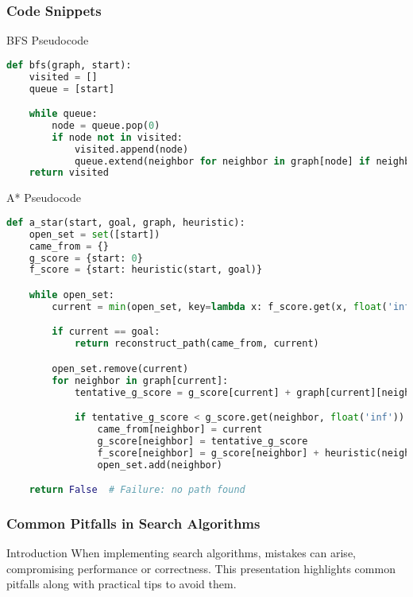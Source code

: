 \documentclass[aspectratio=169]{beamer}
\begin{document}
\begin{frame}[fragile]
    \frametitle{Code Snippets}
    \begin{block}{BFS Pseudocode}
    \begin{lstlisting}[language=Python]
def bfs(graph, start):
    visited = []
    queue = [start]

    while queue:
        node = queue.pop(0)
        if node not in visited:
            visited.append(node)
            queue.extend(neighbor for neighbor in graph[node] if neighbor not in visited)
    return visited
    \end{lstlisting}
    \end{block}

    \begin{block}{A* Pseudocode}
    \begin{lstlisting}[language=Python]
def a_star(start, goal, graph, heuristic):
    open_set = set([start])
    came_from = {}
    g_score = {start: 0}
    f_score = {start: heuristic(start, goal)}

    while open_set:
        current = min(open_set, key=lambda x: f_score.get(x, float('inf')))

        if current == goal:
            return reconstruct_path(came_from, current)

        open_set.remove(current)
        for neighbor in graph[current]:
            tentative_g_score = g_score[current] + graph[current][neighbor]

            if tentative_g_score < g_score.get(neighbor, float('inf')):
                came_from[neighbor] = current
                g_score[neighbor] = tentative_g_score
                f_score[neighbor] = g_score[neighbor] + heuristic(neighbor, goal)
                open_set.add(neighbor)

    return False  # Failure: no path found
    \end{lstlisting}
    \end{block}
\end{frame}

\begin{frame}
    \frametitle{Common Pitfalls in Search Algorithms}
    \begin{block}{Introduction}
        When implementing search algorithms, mistakes can arise, compromising performance or correctness. This presentation highlights common pitfalls along with practical tips to avoid them.
    \end{block}
\end{frame}
\end{document}
